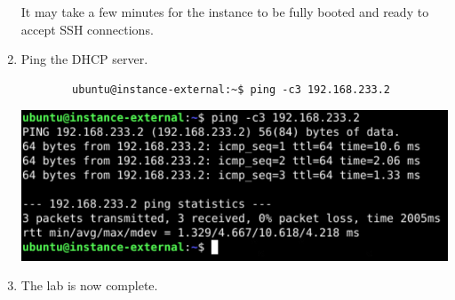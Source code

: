 \documentclass[letterpaper, 12pt]{article}
\begin{document}
\begin{enumerate}
    \begin{notebox}
        It may take a few minutes for the instance to be fully booted and ready to accept SSH connections.
    \end{notebox}

    \item Ping the DHCP server.
    \begin{lstlisting}
        ubuntu@instance-external:~$ ping -c3 192.168.233.2
    \end{lstlisting}

    \begin{center}
        \includegraphics[width=\linewidth]{images/part6/step6.png}
    \end{center}

    \item The lab is now complete.

\end{enumerate}
\end{document}
